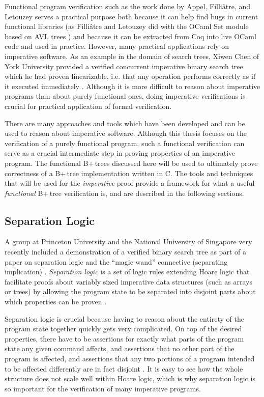 \documentclass[a4paper,12pt]{article}
\begin{document}
Functional program verification such as the work done by Appel, Filliâtre, and Letouzey serves a practical purpose both because it can help find bugs in current functional libraries (as Filliâtre and Letouzey did with the OCaml Set module based on AVL trees \cite{filliatre:hal-00150913}) and because it can be extracted from Coq into live OCaml code and used in practice. However, many practical applications rely on imperative software. As an example in the domain of search trees, Xiwen Chen of York University provided a verified concurrent imperative binary search tree which he had proven linearizable, i.e. that any operation performs correctly as if it executed immediately \cite{chen_ruppert_breugel_2013}. Although it is more difficult to reason about imperative programs than about purely functional ones, doing imperative verifications is crucial for practical application of formal verification.

There are many approaches and tools which have been developed and can be used to reason about imperative software. Although this thesis focuses on the verification of a purely functional program, such a functional verification can serve as a crucial intermediate step in proving properties of an imperative program. The functional B+\,trees discussed here will be used to ultimately prove correctness of a B+\,tree implementation written in C. The tools and techniques that will be used for the \textit{imperative} proof provide a framework for what a useful \textit{functional} B+\,tree verification is, and are described in the following sections.

\subsection{Separation Logic}

A group at Princeton University and the National University of Singapore very recently included a demonstration of a verified binary search tree as part of a paper on separation logic and the “magic wand” connective (separating implication) \cite{cao_wang_hobor_appel_2017}. \textit{Separation logic} is a set of logic rules extending Hoare logic that facilitate proofs about variably sized imperative data structures (such as arrays or trees) by allowing the program state to be separated into disjoint parts about which properties can be proven \cite{1029817}.

Separation logic is crucial because having to reason about the entirety of the program state together quickly gets very complicated. On top of the desired properties, there have to be assertions for exactly what parts of the program state any given command affects, and assertions that no other part of the program is affected, and assertions that any two portions of a program intended to be affected differently are in fact disjoint \cite{1029817}. It is easy to see how the whole structure does not scale well within Hoare logic, which is why separation logic is so important for the verification of many imperative programs.
\end{document}
